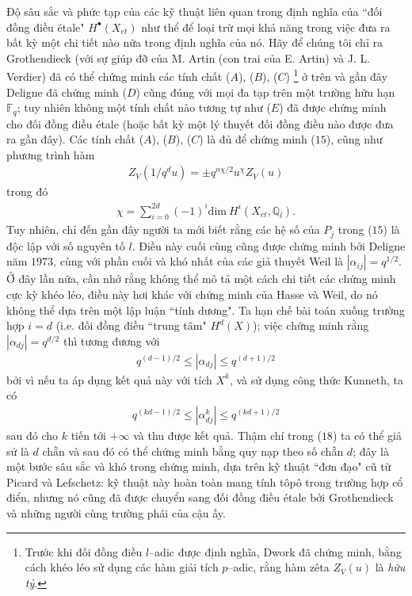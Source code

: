 \begin{multicols}{2}
	Độ sâu sắc và phức tạp của các kỹ thuật liên quan trong định nghĩa của ``đối đồng điều \'etale" $H^{\bullet}(X_{et})$ như thể để loại trừ mọi khả năng trong việc đưa ra bất kỳ một chi tiết nào nữa trong định nghĩa của nó. Hãy để chúng tôi chỉ ra Grothendieck (với sự giúp đỡ của M. Artin (con trai của E. Artin) và J. L. Verdier) đã có thể chứng minh các tính chất ($A$), ($B$), ($C$) \footnote[1]{\color{duongvaotoanhoc}Trước khi đối đồng điều $l$--adic được định nghĩa, Dwork đã chứng minh, bằng cách khéo léo sử dụng các hàm giải tích $p$--adic, rằng hàm zêta $Z_V(u)$ là \textit{hữu tỷ}.} ở trên và gần đây Deligne đã chứng minh ($D$) cũng đúng với mọi đa tạp trên một trường hữu hạn $\mathbb{F}_q$; tuy nhiên không một tính chất nào tương tự như ($E$) đã được chứng minh cho đối đồng điều \'etale (hoặc bất kỳ một lý thuyết đối đồng điều nào được đưa ra gần đây). Các tính chất ($A$), ($B$), ($C$) là đủ để chứng minh ($15$), cũng như phương trình hàm
	\begin{align*}
		Z_V(1/q^d u) = \pm q^{n\chi/2} u^{\chi}Z_V(u)
	\end{align*}
	trong đó
	\begin{align*}
		\chi = \sum_{i=0}^{2d} (-1)^i \mathrm{dim} \ H^i(X_{et},\mathbb{Q}_l).
	\end{align*}
	Tuy nhiên, chỉ đến gần đây người ta mới biết rằng các hệ số của $P_j$ trong ($15$) là độc lập với số nguyên tố $l$. Điều này cuối cùng cũng được chứng minh bởi Deligne năm $1973$, cùng với phần cuối và khó nhất của các giả thuyết Weil là $\left|\alpha_{ij}\right|=q^{1/2}$.
	\vskip 0.1cm
	Ở đây lần nữa, cần nhớ rằng không thể mô tả một cách chi tiết các chứng minh cực kỳ khéo léo, điều này hơi khác với chứng minh của Hasse và Weil, do nó không thể dựa trên một lập luận ``tính dương". Ta hạn chế bài toán xuống trường hợp $i=d$ (i.e. đối đồng điều ``trung tâm" $H^d(X)$); việc chứng minh rằng $\left|\alpha_{dj}\right|=q^{d/2}$ thì tương đương với
	\begin{align*} \label{eq:18}
		q^{(d-1)/2} \leq \left|\alpha_{dj}\right| \leq q^{(d+1)/2} \tag{$18$}
	\end{align*}
	bởi vì nếu ta áp dụng kết quả này với tích $X^k$, và sử dụng công thức Kunneth, ta có
	\begin{align*} 
		q^{(kd-1)/2} \leq \left|\alpha_{dj}^k \right| \leq q^{(kd+1)/2}
	\end{align*}
	sau đó cho $k$ tiến tới $+\infty$ và thu được kết quả. Thậm chí trong ($18$) ta có thể giả sử là $d$ chẵn và sau đó có thể chứng minh bằng quy nạp theo số chẵn $d$; đây là một bước sâu sắc và khó trong chứng minh, dựa trên kỹ thuật ``đơn đạo" cũ từ Picard và Lefschetz: kỹ thuật này hoàn toàn mang tính tôpô trong trường hợp cổ điển, nhưng nó cũng đã được chuyển sang đối đồng điều \'etale bởi Grothendieck và những người cùng trường phái của cậu ấy.

\end{multicols}
